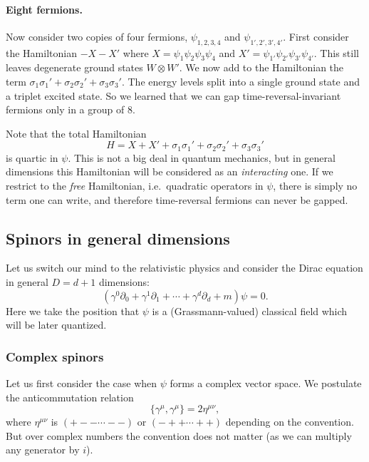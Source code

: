 \documentclass[12pt]{article}
\numberwithin{equation}{section}
\numberwithin{figure}{section}
\theoremstyle{remark}
\begin{document}
\paragraph{Eight fermions.}
Now consider two copies of four fermions, $\psi_{1,2,3,4}$ and $\psi_{1',2',3',4'}$.
First consider the Hamiltonian $-X-X'$ where $X=\psi_1\psi_2\psi_3\psi_4$ and 
$X'=\psi_{1'} \psi_{2'}\psi_{3'}\psi_{4'}$.
This still leaves degenerate ground states $W\otimes W'$.
We now add to the Hamiltonian the term $\sigma_1 \sigma_1' +\sigma_2 \sigma_2'+\sigma_3 \sigma_3'$. 
The energy levels split into a single ground state and a triplet excited state.
So we learned that we can gap time-reversal-invariant fermions only in a group of 8.

Note that the total Hamiltonian  \begin{equation}
H=X+X'+\sigma_1 \sigma_1' +\sigma_2 \sigma_2'+\sigma_3 \sigma_3'
\end{equation} is quartic in $\psi$. 
This is not a big deal in quantum mechanics, but in general dimensions this Hamiltonian 
will be considered as an \emph{interacting} one.
If we restrict to the \emph{free} Hamiltonian, i.e.~quadratic operators in $\psi$,
there is simply no term one can write,
and therefore time-reversal fermions can never be gapped.


\subsection{Spinors in general dimensions}

Let us switch our mind to the relativistic physics and consider the Dirac equation 
in general $D=d+1$ dimensions: \begin{equation}
(\gamma^0\partial_0 + \gamma^1\partial_1+\cdots+\gamma^d\partial_d + m ) \psi=0.
\end{equation}
Here we take the position that $\psi$ is a (Grassmann-valued) classical field 
which will be later quantized.

\subsubsection{Complex spinors}
Let us first consider the case when $\psi$ forms a complex vector space.
We postulate the anticommutation relation \begin{equation}
\{\gamma^\mu ,\gamma^\mu\} = 2\eta^{\mu\nu},
\end{equation} where $\eta^{\mu\nu}$ is $(+--\cdots--)$ or $(-++\cdots++)$ 
depending on the convention.
But over complex numbers the convention does not matter 
(as we can multiply any generator by $i$).
\end{document}
